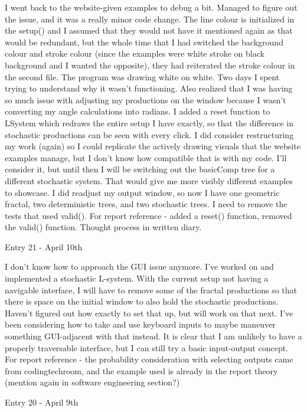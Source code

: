 \documentclass[]{final_report}
\begin{document}
I went back to the website-given examples to debug a bit. Managed to figure out the issue, and it was a really minor code change. The line colour is initialized in the setup() and I assumed that they would not have it mentioned again as that would be redundant, but the whole time that I had switched the background colour and stroke colour (since the examples were white stroke on black background and I wanted the opposite), they had reiterated the stroke colour in the second file. The program was drawing white on white. Two days I spent trying to understand why it wasn't functioning. Also realized that I was having so much issue with adjusting my productions on the window because I wasn't converting my angle calculations into radians. I added a reset function to LSystem which redraws the entire setup I have exactly, so that the difference in stochastic productions can be seen with every click. I did consider restructuring my work (again) so I could replicate the actively drawing visuals that the website examples manage, but I don't know how compatible that is with my code. I'll consider it, but until then I will be switching out the basicComp tree for a different stochastic system. That would give me more visibly different examples to showcase. I did readjust my output window, so now I have one geometric fractal, two deterministic trees, and two stochastic trees. I need to remove the tests that used valid().
For report reference - added a reset() function, removed the valid() function. Thought process in written diary.

Entry 21 - April 10th

I don't know how to approach the GUI issue anymore. I've worked on and implemented a stochastic L-system. With the current setup not having a navigable interface, I will have to remove some of the fractal productions so that there is space on the initial window to also hold the stochastic productions. Haven't figured out how exactly to set that up, but will work on that next. I've been considering how to take and use keyboard inputs to maybe maneuver something GUI-adjacent with that instead. It is clear that I am unlikely to have a properly traversable interface, but I can still try a basic input-output concept.
For report reference - the probability consideration with selecting outputs came from codingtechroom, and the example used is already in the report theory (mention again in software engineering section?)

Entry 20 - April 9th
\end{document}
